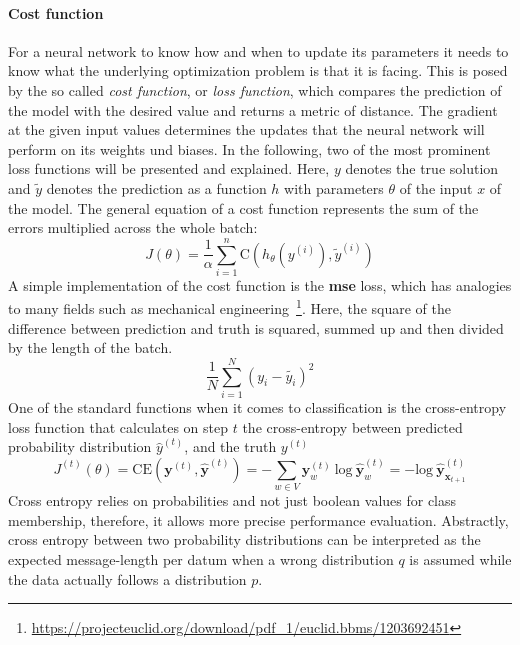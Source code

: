\paragraph{Cost function}\label{par:cost_function}
For a neural network to know how and when to update its parameters it needs to know what the underlying optimization problem is that it is facing. This is posed by the so called \textit{cost function}, or \textit{loss function}, which compares the prediction of the model with the desired value and returns a metric of distance. The gradient at the given input values determines the updates that the neural network will perform on its weights und biases. In the following, two of the most prominent loss functions will be presented and explained. Here, $ y $ denotes the true solution and $ \widetilde{y} $ denotes the prediction as a function $ h $ with parameters $ \theta $ of the input $ x $ of the model. The general equation of a cost function represents the sum of the errors multiplied across the whole batch:
\begin{equation}
	J(\theta) = \frac{1}{\alpha} \sum_{i=1}^{n} \text{C} (h_{\theta} (y^{(i)}), \widetilde{y}^{(i)})
\end{equation}
A simple implementation of the cost function is the \textbf{\gls{mse}} loss, which has analogies to many fields such as mechanical engineering~\footnote{\url{https://projecteuclid.org/download/pdf_1/euclid.bbms/1203692451}}. Here, the square of the difference between prediction and truth is squared, summed up and then divided by the length of the batch.
\begin{equation}
	\frac{1}{N} \sum_{i=1}^{N} \left( y_i - \widetilde{y_i} \right)^2
\end{equation}
One of the standard functions when it comes to classification is the cross-entropy loss function that calculates on step $ t $ the cross-entropy between predicted probability distribution $ \hat{y}^{(t)} $, and the truth $ y^{(t)} $
\begin{equation}
	J^{(t)}(\theta) = \text{CE}(\pmb{y}^{(t)}, \hat{\pmb{y}}^{(t)}) = - \sum_{w \in V} \pmb{y}_w^{(t)} \ \text{log} \ \hat{\pmb{y}}_w^{(t)} = - \text{log} \ \hat{\pmb{y}}_{\pmb{x}_{t+1}}^{(t)}
\end{equation}
Cross entropy relies on probabilities and not just boolean values for class membership, therefore, it allows more precise performance evaluation. Abstractly, cross entropy between two probability distributions can be interpreted as the expected message-length per datum when a wrong distribution $ q $ is assumed while the data actually follows a distribution $ p $.

